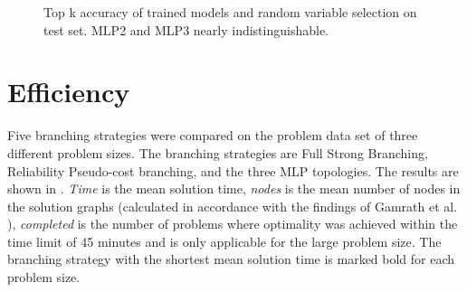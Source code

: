 \begin{figure}
    \caption{Top k accuracy of trained models and random variable selection on test set. MLP2 and MLP3 nearly indistinguishable.}
    \label{fig:topk}
\end{figure}




\section{Efficiency}

Five branching strategies were compared on the problem data set of three different problem sizes. The branching strategies are Full Strong Branching, Reliability Pseudo-cost branching, and the three \gls{MLP} topologies. The results are shown in . \textit{Time} is the mean solution time, \textit{nodes} is the mean number of nodes in the solution graphs (calculated in accordance with the findings of Gamrath et al. \cite{gamrath2018measuring}), \textit{completed} is the number of problems where optimality was achieved within the time limit of 45 minutes and is only applicable for the large problem size. The branching strategy with the shortest mean solution time is marked bold for each problem size. 

